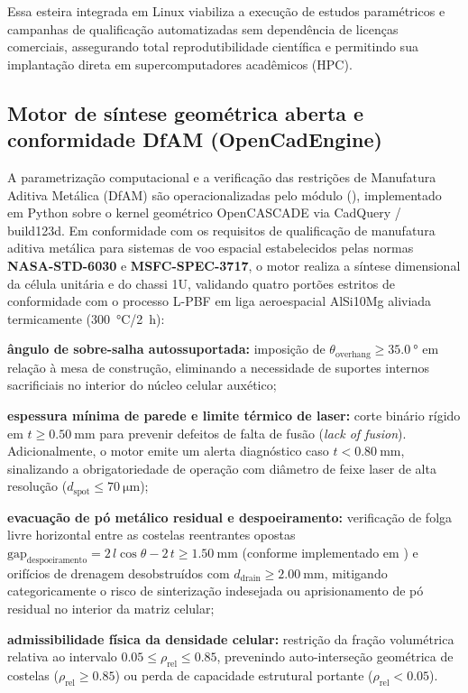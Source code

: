 Essa esteira integrada em Linux viabiliza a execução de estudos paramétricos e campanhas de qualificação automatizadas sem dependência de licenças comerciais, assegurando total reprodutibilidade científica e permitindo sua implantação direta em supercomputadores acadêmicos (HPC).

\subsection{Motor de síntese geométrica aberta e conformidade DfAM (OpenCadEngine)}
\label{subsec:opencad-dfam}

A parametrização computacional e a verificação das restrições de Manufatura Aditiva Metálica (DfAM) são operacionalizadas pelo módulo  (), implementado em Python sobre o kernel geométrico OpenCASCADE via CadQuery / build123d. Em conformidade com os requisitos de qualificação de manufatura aditiva metálica para sistemas de voo espacial estabelecidos pelas normas \textbf{NASA-STD-6030} e \textbf{MSFC-SPEC-3717}, o motor realiza a síntese dimensional da célula unitária e do chassi 1U, validando quatro portões estritos de conformidade com o processo L-PBF em liga aeroespacial AlSi10Mg aliviada termicamente (\SI{300}{\celsius}/\SI{2}{\hour}):
\begin{alineas}
  \item \textbf{ângulo de sobre-salha autossuportada:} imposição de $\theta_{\text{overhang}} \ge \SI{35.0}{\degree}$ em relação à mesa de construção, eliminando a necessidade de suportes internos sacrificiais no interior do núcleo celular auxético;
  \item \textbf{espessura mínima de parede e limite térmico de laser:} corte binário rígido em $t \ge \SI{0.50}{\milli\metre}$ para prevenir defeitos de falta de fusão (\textit{lack of fusion}). Adicionalmente, o motor emite um alerta diagnóstico caso $t < \SI{0.80}{\milli\metre}$, sinalizando a obrigatoriedade de operação com diâmetro de feixe laser de alta resolução ($d_{\text{spot}} \le \SI{70}{\micro\metre}$);
  \item \textbf{evacuação de pó metálico residual e despoeiramento:} verificação de folga livre horizontal entre as costelas reentrantes opostas $\text{gap}_{\text{despoeiramento}} = 2\,l\cos\theta - 2\,t \ge \SI{1.50}{\milli\metre}$ (conforme implementado em ) e orifícios de drenagem desobstruídos com $d_{\text{drain}} \ge \SI{2.00}{\milli\metre}$, mitigando categoricamente o risco de sinterização indesejada ou aprisionamento de pó residual no interior da matriz celular;
  \item \textbf{admissibilidade física da densidade celular:} restrição da fração volumétrica relativa ao intervalo $\num{0.05} \le \rho_{\text{rel}} \le \num{0.85}$, prevenindo auto-interseção geométrica de costelas ($\rho_{\text{rel}} \ge \num{0.85}$) ou perda de capacidade estrutural portante ($\rho_{\text{rel}} < \num{0.05}$).
\end{alineas}


